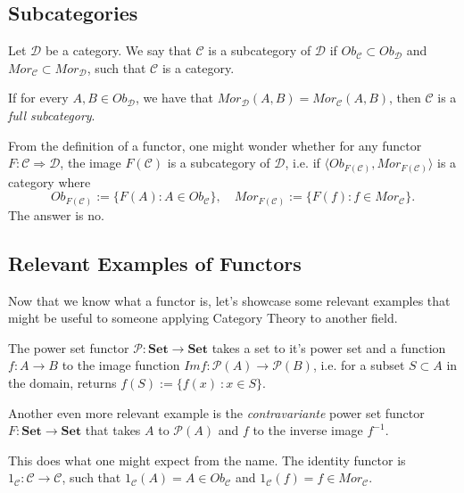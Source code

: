 \subsection{Subcategories}

\begin{definition}[Subcategory]
  Let $\mathcal D$ be a category. We say that $\mathcal C$
  is a subcategory of $\mathcal D$ if $Ob_\mathcal C \subset Ob_\mathcal D$ and
  $Mor_\mathcal C \subset Mor_\mathcal D$, such that $\mathcal C$ is a category.

  If for every $A, B \in Ob_\mathcal D$, we have that $Mor_\mathcal D (A,B) = Mor_\mathcal C(A,B)$,
  then $\mathcal C$ is a \textit{full subcategory}.
\end{definition}

From the definition of a functor, one might wonder whether for any
functor $F:\mathcal C \Rightarrow \mathcal D$,
the image $F(\mathcal C)$ is a subcategory of $\mathcal D$, i.e.
if $\langle Ob_{F(\mathcal C)}, Mor_{F(\mathcal C)} \rangle$ is a category where
\begin{displaymath}
  Ob_{F(\mathcal C)}:= \{F(A) : A \in Ob_\mathcal C\}, \quad
  Mor_{F(\mathcal C)}:= \{F(f) : f \in Mor_\mathcal C\}.
\end{displaymath}
The answer is no.

\subsection{Relevant Examples of Functors}

Now that we know what a functor is, let's showcase some relevant examples
that might be useful to someone applying Category Theory to another field.

\begin{example}
  The power set functor $\mathcal P : \mathbf{Set} \to \mathbf{Set}$ takes a
  set to it's power set and a function $f:A\to B$ to the image function
  $Im f : \mathcal P(A) \to \mathcal P(B)$, i.e. for a subset $S \subset A$
  in the domain, returns $f(S) := \{ f(x) \ : x \in S\}$.

  Another even more relevant example is the \textit{contravariante} power set
  functor $F : \mathbf{Set} \to \mathbf{Set}$ that takes $A$ to $\mathcal P(A)$
  and $f$ to the inverse image $f^{-1}$.
\end{example}

\begin{example}
  This does what one might expect from the name. The identity
  functor is $1_\mathcal C : \mathcal C \to \mathcal C$, such that
  $1_\mathcal C (A) = A \in Ob_\mathcal C$ and
  $1_\mathcal C (f) = f \in Mor_\mathcal C$.
\end{example}


